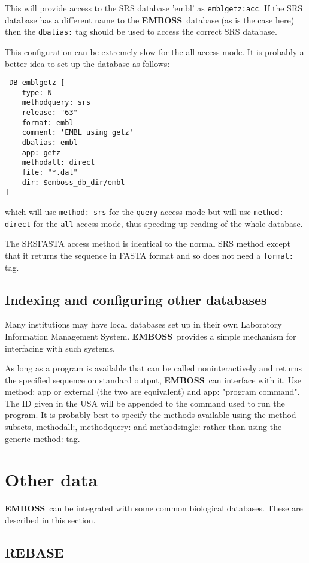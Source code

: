 \documentclass{report}
\newcommand{\ilcomm}[1]{{\tt #1}}
\newcommand{\EMBOSS}{{\sf\bfseries EMBOSS}}
\begin{document}
This will provide access to the SRS database 'embl' as \ilcomm{emblgetz:acc}. If the SRS database has a different name to the \EMBOSS\ database (as is the case here) then the \ilcomm{dbalias:} tag should be used to access the correct SRS database.

This configuration can be extremely slow for the all access mode. It is probably a better idea to set up the database as follows:
\begin{verbatim}
 DB emblgetz [ 
    type: N 
    methodquery: srs 
    release: "63" 
    format: embl
    comment: 'EMBL using getz' 
    dbalias: embl 
    app: getz 
    methodall: direct
    file: "*.dat"
    dir: $emboss_db_dir/embl
]
\end{verbatim}
which will use \ilcomm{method: srs} for the \ilcomm{query} access mode but will use \ilcomm{method: direct} for the \ilcomm{all} access mode, thus speeding up reading of the whole database.

The SRSFASTA access method is identical to the normal SRS method except that it returns the sequence in FASTA format and so does not need a \ilcomm{format:} tag.


\subsection{Indexing and configuring other databases}

Many institutions may have local databases set up in their own Laboratory Information Management System. \EMBOSS\ provides a simple mechanism for interfacing with such systems.

As long as a program is available that can be called noninteractively and returns the specified sequence on standard output, \EMBOSS\ can interface with it.
Use method: app or external (the two are equivalent) and app: "program command".
The ID given in the USA will be appended to the command used to run the program. It is probably best to specify the methods available using the method subsets, methodall:, methodquery: and methodsingle: rather than using the generic method: tag.


\section{Other data}

\EMBOSS\ can be integrated with some common biological databases. These are described in this section.

      \subsection{REBASE}
\end{document}
